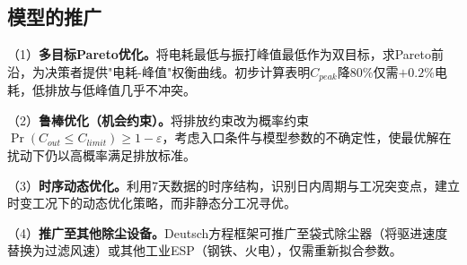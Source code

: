 
\subsection{模型的推广}

（1）\textbf{多目标Pareto优化\cite{deb2002}。}将电耗最低与振打峰值最低作为双目标，求Pareto前沿，为决策者提供"电耗-峰值"权衡曲线。初步计算表明$C_{peak}$降80\%仅需$+0.2\%$电耗，低排放与低峰值几乎不冲突。

（2）\textbf{鲁棒优化（机会约束）。}将排放约束改为概率约束$\Pr(C_{out}\leq C_{limit})\geq 1-\varepsilon$，考虑入口条件与模型参数的不确定性，使最优解在扰动下仍以高概率满足排放标准。

（3）\textbf{时序动态优化。}利用7天数据的时序结构，识别日内周期与工况突变点，建立时变工况下的动态优化策略，而非静态分工况寻优。

（4）\textbf{推广至其他除尘设备。}Deutsch方程框架可推广至袋式除尘器（将驱进速度替换为过滤风速）或其他工业ESP（钢铁、火电），仅需重新拟合参数。